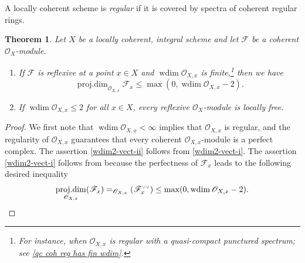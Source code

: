 \documentclass[JEP,XML,SOM,Unicode,published]{cedram}
\newenvironment{enumeratei}
{\bgroup\def\theenumi{\roman{enumi}}\def\theenumii{\arabic{enumii}}\begin{enumerate}}
{\end{enumerate}\egroup}
\newcommand{\NoChangel}[1]{%
\expandafter\let\csname old\string#1\endcsname=#1
\let#1=\relax
\newcommand{#1}{\mathop{\mathcode`l="716C\csname old\string#1\endcsname\mathcode`l="7160}\nolimits}%
}
\let\oldvee\vee
\renewcommand{\vee}{{\scriptscriptstyle\oldvee}}
\newcommand{\sF}{\mathscr{F}}
\newcommand{\sO}{\mathscr{O}}
\DeclareMathOperator{\fldim}{fl.dim}\NoChangel{\fldim}
\newcommand{\ddual}{\vee\vee}
\DeclareMathOperator{\wdim}{wdim}
\DeclareMathOperator{\pd}{proj.dim}
\newcommand{\bpf}{\begin{proof}}
\newcommand{\epf}{\end{proof}}
\newcommand{\bthm}{\begin{thm}}
\newcommand{\ethm}{\end{thm}}
\newcommand{\benumr}{\begin{enumeratei}}
\newcommand{\eenumr}{\end{enumeratei}}
\theoremstyle{plain}
\newtheorem{thm}[subsection]{Theorem}
\theoremstyle{definition}
\begin{document}
A locally coherent scheme is \emph{regular} if it is covered by spectra of coherent regular rings.
\bthm\label{wdim2-vect}
Let $X$ be a locally coherent, integral scheme and let $\sF$ be a coherent $\sO_X$\nobreakdash-mod\-ule.
\benumr
\item\label{wdim2-vect-i} If $\sF$ is reflexive at a point $x\in X$ and $\wdim\sO_{X,x}$ is finite,\footnote{For instance, when $\sO_{X,x}$ is regular with a quasi-compact punctured spectrum; see \eqref{qc coh reg has fin wdim}.} then we have
\[
\pd_{\sO_{X,x}}\sF_x\leq \max(0,\wdim\sO_{X,x}-2).
\]
\item\label{wdim2-vect-ii} If $\wdim\sO_{X,x}\leq 2$ for all $x\in X$, every reflexive $\sO_X$\nobreakdash-mod\-ule is locally free.
\eenumr
\ethm
\bpf
We first note that $\wdim\sO_{X,x}<\infty$ implies that $\sO_{X,x}$ is regular, and the regularity of $\sO_{X,x}$ guarantees that every coherent $\sO_{X,x}$\nobreakdash-mod\-ule is a perfect complex.
The assertion \eqref{wdim2-vect-ii} follows from \eqref{wdim2-vect-i}.
The assertion \eqref{wdim2-vect-i} follows from  because the perfectness of $\sF_x$ leads to the following desired inequality
\[
\pd_{\sO_{X,x}}(\sF_x)=\fldim_{\sO_{X,x}}(\sF_x^{\ddual})\leq \max(0,\wdim\sO_{X,x}-2). \qedhere
\]
\epf
\end{document}
